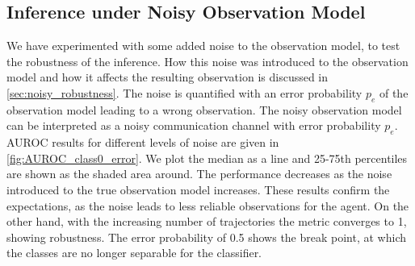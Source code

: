 \subsection{Inference under Noisy Observation Model}
We have experimented with some added noise to the observation model, to test the robustness of the inference. How this noise was introduced to the observation model and how it affects the resulting observation is discussed in \cref{sec:noisy_robustness}. The noise is quantified with an error probability $ p_e $ of the observation model leading to a wrong observation. The noisy observation model can be interpreted as a noisy communication channel with error probability $ p_e $. \\
AUROC results for different levels of noise are given in \autoref{fig:AUROC_class0_error}. We plot the median as a line and 25-75th percentiles are shown as the shaded area around. The performance decreases as the noise introduced to the true observation model increases. These results confirm the expectations, as the noise leads to less reliable observations for the agent. On the other hand, with the increasing number of trajectories the metric converges to 1, showing robustness. The error probability of 0.5 shows the break point, at which the classes are no longer separable for the classifier. 
\pagebreak

